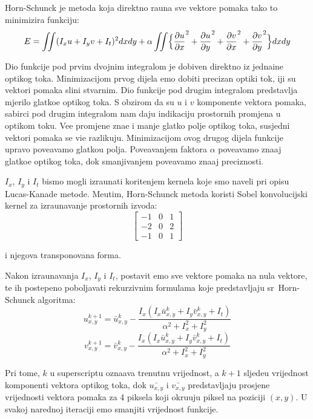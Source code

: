 Horn-Schunck je metoda koja direktno ra\ch una sve vektore pomaka tako \sh to minimizira funkciju:
\[
E=\iint(I_xu+I_yv+I_t)^2dxdy+\alpha \iint\Bigl\{\frac{\partial u}{\partial x}^2+\frac{\partial u}{\partial y}^2+\frac{\partial v}{\partial x}^2+\frac{\partial v}{\partial y}^2\Bigr\}dxdy
\]

Dio funkcije pod prvim dvojnim integralom je dobiven direktno iz jedna\ch ine opti\ch kog toka. Minimizacijom prvog dijela \cj emo dobiti precizan opti\ch ki tok,
\ch iji su vektori pomaka sli\ch ni stvarnim. Dio funkcije pod drugim integralom predstavlja mjerilo glatko\cj e opti\ch kog toka. S obzirom da su $u$ i $v$ komponente
vektora pomaka, sabirci pod drugim integralom nam daju indikaciju prostornih promjena u opti\ch kom toku. Ve\cj e promjene zna\ch e i manje glatko polje
opti\ch kog toka, susjedni vektori pomaka se vi\sh e razlikuju. Minimizacijom ovog drugog dijela funkcije upravo pove\cj avamo glatko\cj u polja. Pove\cj avanjem
faktora $\alpha$ pove\cj avamo zna\ch aj glatko\cj e opti\ch kog toka, dok smanjivanjem pove\cj avamo zna\ch aj preciznosti.

$I_x$, $I_y$ i $I_t$ bismo mogli izra\ch unati kori\sh tenjem kernela koje smo naveli pri opisu Lucas-Kanade metode. Me\dj utim, Horn-Schunck metoda koristi
Sobel konvolucijski kernel za izra\ch unavanje prostornih izvoda:
\[
\begin{bmatrix}
-1 & 0 & 1 \\
-2 & 0 & 2 \\
-1 & 0 & 1
\end{bmatrix}
\]

i njegova transponovana forma. 

Nakon izra\ch unavanja $I_x$, $I_y$ i $I_t$, postavit \cj emo sve vektore pomaka na nula vektore, te ih postepeno pobolj\sh avati rekurzivnim formulama
koje predstavljaju sr\zh\ Horn-Schunck algoritma:
\[
u_{x,y}^{k+1}=\bar{u}_{x,y}^{k}-\frac{I_x(I_x\bar{u}_{x,y}^{k}+I_y\bar{v}_{x,y}^{k}+I_t)}{\alpha^2+I_x^2+I_y^2}
\]
\[
v_{x,y}^{k+1}=\bar{v}_{x,y}^{k}-\frac{I_x(I_x\bar{u}_{x,y}^{k}+I_y\bar{v}_{x,y}^{k}+I_t)}{\alpha^2+I_x^2+I_y^2}
\]

Pri tome, $k$ u superscriptu ozna\ch ava trenutnu vrijednost, a $k+1$ sljede\cj u vrijednost komponenti vektora opti\ch kog toka, dok $\bar{u_{x,y}}$ i $\bar{v_{x,y}}$
predstavljaju prosje\ch ne vrijednosti vektora pomaka za 4 piksela koji okru\zh uju piksel na poziciji $(x,y)$. U svakoj narednoj iteraciji \cj emo smanjiti vrijednost
funkcije.